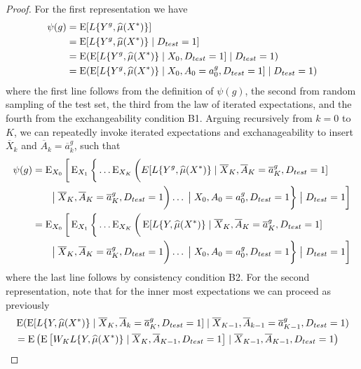\begin{proof}
    For the first representation we have 
    \begin{align*}
        \psi(g) &= \operatorname{E}[L\{Y^{g}, \widehat{\mu}(X^*)\}] \\
        & = \operatorname{E}[L\{Y^{g}, \widehat{\mu}(X^*)\}\mid D_{test} = 1] \\
        & = \operatorname{E}(\operatorname{E}[L\{Y^{g}, \widehat{\mu}(X^*)\}\mid X_0, D_{test} = 1] \mid D_{test} = 1) \\
        & = \operatorname{E}(\operatorname{E}[L\{Y^{g}, \widehat{\mu}(X^*)\}\mid X_0, A_0 = a^g_0, D_{test} = 1] \mid D_{test} = 1) 
    \end{align*}
    where the first line follows from the definition of $\psi(g)$, the second from random sampling of the test set, the third from the law of iterated expectations, and the fourth from the exchangeability condition B1. Arguing recursively from $k = 0$ to $K$, we can repeatedly invoke iterated expectations and exchanageability to insert $\overline{X}_k$ and $\overline{A}_k = \overline{a}^g_k$, such that
    \begin{align*}
        \psi(g) &= \operatorname{E}_{X_0}\bigg[\operatorname{E}_{X_1}\bigg\{\ldots \operatorname{E}_{X_{K}}\bigg(E[L\{Y^g, \widehat{\mu}(X^*)\} \mid \overline{X}_K, \overline{A}_K=\overline{a}^g_K, D_{test} = 1] \\
        & \qquad \big\vert\; \overline{X}_{K}, \overline{A}_{K}=\overline{a}^g_{K}, D_{test} = 1\bigg) \ldots \;\big\vert\; X_{0}, A_{0}=a^g_{0}, D_{test} = 1\bigg\}\;\big\vert\; D_{test} = 1\bigg]\\
        &= \operatorname{E}_{X_0}\bigg[\operatorname{E}_{X_1}\bigg\{\ldots \operatorname{E}_{X_{K}}\bigg(\operatorname{E}[L\{Y, \widehat{\mu}(X^*)\} \mid \overline{X}_K, \overline{A}_K=\overline{a}^g_K, D_{test} = 1] \\
        & \qquad \big\vert\; \overline{X}_{K}, \overline{A}_{K}=\overline{a}^g_{K}, D_{test} = 1\bigg) \ldots \;\big\vert\; X_{0}, A_{0}=a^g_{0}, D_{test} = 1\bigg\}\;\big\vert\; D_{test} = 1\bigg]
    \end{align*}
    where the last line follows by consistency condition B2. For the second representation, note that for the inner most expectations we can proceed as previously
    \begin{align*}
        & \E(\E[L\{Y, \widehat{\mu}(X^*)\} \mid \overline{X}_K, \overline{A}_k=\overline{a}^g_K, D_{test} = 1] \mid \overline{X}_{K-1}, \overline{A}_{k-1}=\overline{a}^g_{K-1}, D_{test} = 1) \\
        &= \E\left(\E\left[W_K L\{Y, \widehat{\mu}(X^*)\} \mid \overline{X}_K, \overline{A}_{K-1}, D_{test} = 1\right] \mid \overline{X}_{K-1}, \overline{A}_{K-1}, D_{test} = 1\right)\\

\end{align*}
\end{proof}
